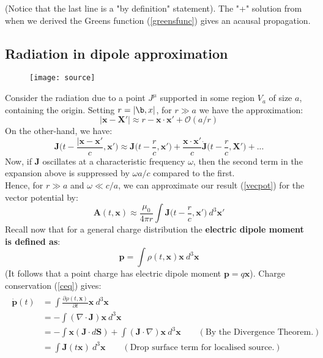 \documentclass[a4paper]{article}
\numberwithin{equation}{section}
\begin{document}
(Notice that the last line is a "by definition" statement). The "+" solution from when we derived the Greens function (\ref{greensfunc}) gives an acausal propagation.\\
\subsection{Radiation in dipole approximation}
\begin{wrapfigure}[10]{r}{0.3 \textwidth}
	\texttt{[image: source]}
\end{wrapfigure}
Consider the radiation due to a point $J^\mu$ supported in some region $V_a$ of size $a$, containing the origin. Setting $r = |\b,{x}|$, for $r \gg a$ we have the approximation:
\begin{equation}
|\bm{x} - \bm{X}'| \approx r - \bm{x} \cdot \bm{x}' + \mathcal{O}(a/r)
\end{equation}
On the other-hand, we have:
\begin{equation}
\bm{J}\bigg(t-\frac{|\bm{x}-\bm{x}'}{c}, \bm{x}' \bigg) \approx \bm{J}\bigg( t-\frac{r}{c},\bm{x}' \bigg) + \frac{\bm{x}\cdot \bm{x}'}{c} \dot{\bm{J}}\bigg( t- \frac{r}{c} , \bm{X}' \bigg) + ...
\end{equation}
Now, if $\bm{J}$ oscillates at a characteristic frequency $\omega$, then the second term in the expansion above is suppressed by $\omega a /c$ compared to the first. \\
Hence, for $r \gg a$ and $\omega \ll c/a$, we can approximate our result (\ref{vecpot}) for the vector potential by:
\begin{equation} \label{vecpot2}
\bm{A}(t, \bm{x}) \approx \frac{\mu_0}{4\pi r} \int \bm{J}\bigg( t - \frac{r}{c}, \bm{x}'\bigg) \ d^3 \bm{x}'
\end{equation}
Recall now that for a general charge distribution the \textbf{electric dipole moment is defined as}:
\begin{equation}
\bm{p} = \int \rho(t, \bm{x}) \bm{x} \ d^3 \bm{x}
\end{equation}
(It follows that a point charge has electric dipole moment $\bm{p} = q \bm{x}$). Charge conservation (\ref{ceq}) gives:
\begin{align}
\begin{split}
\dot{\bm{p}}(t) &= \int \frac{\partial \rho(t, \bm{x})}{\partial t}\bm{x} \ d^3 \bm{x} \\
&=- \int (\nabla \cdot \bm{J}) \bm{x} \ d^3 \bm{x} \\
&= - \int \bm{x} (\bm{J} \cdot d\bm{S}) + \int (\bm{J} \cdot \nabla) \bm{x} \ d^3 \bm{x} \qquad (\text{By the Divergence Theorem.})\\
&= \int \bm{J}(t \bm{x}) \ d^3 \bm{x} \qquad (\text{Drop surface term for localised source.})
\end{split}
\end{align}
\end{document}
